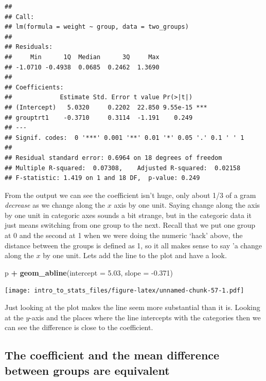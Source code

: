 \documentclass[
]{book}
\newenvironment{Shaded}{\begin{snugshade}}{\end{snugshade}}
\newcommand{\DataTypeTok}[1]{\textcolor[rgb]{0.13,0.29,0.53}{#1}}
\newcommand{\FloatTok}[1]{\textcolor[rgb]{0.00,0.00,0.81}{#1}}
\newcommand{\KeywordTok}[1]{\textcolor[rgb]{0.13,0.29,0.53}{\textbf{#1}}}
\newcommand{\NormalTok}[1]{#1}
\newcommand{\OperatorTok}[1]{\textcolor[rgb]{0.81,0.36,0.00}{\textbf{#1}}}
\newcommand{\StringTok}[1]{\textcolor[rgb]{0.31,0.60,0.02}{#1}}
\begin{document}
\begin{verbatim}
## 
## Call:
## lm(formula = weight ~ group, data = two_groups)
## 
## Residuals:
##     Min      1Q  Median      3Q     Max 
## -1.0710 -0.4938  0.0685  0.2462  1.3690 
## 
## Coefficients:
##             Estimate Std. Error t value Pr(>|t|)    
## (Intercept)   5.0320     0.2202  22.850 9.55e-15 ***
## grouptrt1    -0.3710     0.3114  -1.191    0.249    
## ---
## Signif. codes:  0 '***' 0.001 '**' 0.01 '*' 0.05 '.' 0.1 ' ' 1
## 
## Residual standard error: 0.6964 on 18 degrees of freedom
## Multiple R-squared:  0.07308,	Adjusted R-squared:  0.02158 
## F-statistic: 1.419 on 1 and 18 DF,  p-value: 0.249
\end{verbatim}

From the output we can see the coefficient isn't huge, only about 1/3 of a gram \emph{decrease} as we change along the \(x\) axis by one unit. Saying change along the axis by one unit in categoric axes sounds a bit strange, but in the categoric data it just means switching from one group to the next. Recall that we put one group at 0 and the second at 1 when we were doing the numeric `hack' above, the distance between the groups is defined as 1, so it all makes sense to say 'a change along the \(x\) by one unit. Lets add the line to the plot and have a look.

\begin{Shaded}
\begin{Highlighting}[]
\NormalTok{p }\OperatorTok{+}\StringTok{ }\KeywordTok{geom_abline}\NormalTok{(}\DataTypeTok{intercept =} \FloatTok{5.03}\NormalTok{, }\DataTypeTok{slope =} \FloatTok{-0.371}\NormalTok{)}
\end{Highlighting}
\end{Shaded}

\texttt{[image: intro\_to\_stats\_files/figure-latex/unnamed-chunk-57-1.pdf]}

Just looking at the plot makes the line seem more substantial than it is. Looking at the \(y\)-axis and the places where the line intercepts with the categories then we can see the difference is close to the coefficient.

\hypertarget{the-coefficient-and-the-mean-difference-between-groups-are-equivalent}{%
\subsection{The coefficient and the mean difference between groups are equivalent}\label{the-coefficient-and-the-mean-difference-between-groups-are-equivalent}}
\end{document}
